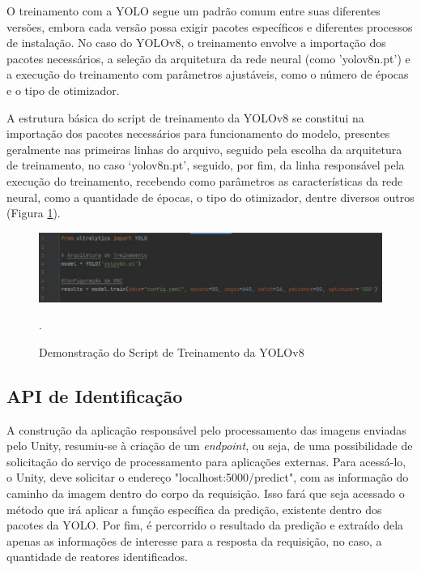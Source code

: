 O treinamento com a YOLO segue um padrão comum entre suas diferentes versões, embora cada versão possa exigir pacotes específicos e diferentes processos de instalação. No caso do YOLOv8, o treinamento envolve a importação dos pacotes necessários, a seleção da arquitetura da rede neural (como 'yolov8n.pt') e a execução do treinamento com parâmetros ajustáveis, como o número de épocas e o tipo de otimizador.

A estrutura básica do script de treinamento da YOLOv8 se constitui na importação dos pacotes necessários para funcionamento do modelo, presentes geralmente nas primeiras linhas do arquivo, seguido pela escolha da arquitetura de treinamento, no caso ‘yolov8n.pt’, seguido, por fim, da linha responsável pela execução do treinamento, recebendo como parâmetros as características da rede neural, como a quantidade de épocas, o tipo do otimizador, dentre diversos outros (Figura \ref{fig:script-yolov8}).

\begin{figure}[!h]
    \centering
    \begin{minipage}{0.6\linewidth}
    \centering
    \captionsetup{justification=centering,margin=0.5cm,font=small}
    \includegraphics[width=1\linewidth]{img/cap5/treinamentoYOLOv8.jpeg}
    \caption{Demonstração do Script de Treinamento da YOLOv8}.
    \label{fig:script-yolov8}
    \end{minipage}
\end{figure}

\subsection{API de Identificação}

A construção da aplicação responsável pelo processamento das imagens enviadas pelo Unity, resumiu-se à criação de um \textit{endpoint}, ou seja, de uma possibilidade de solicitação do serviço de processamento para aplicações externas. Para acessá-lo, o Unity, deve solicitar o endereço "localhost:5000/predict", com as informação do caminho da imagem dentro do corpo da requisição. Isso fará que seja acessado o método que irá aplicar a função específica da predição, existente dentro dos pacotes da YOLO. Por fim, é percorrido o resultado da predição e extraído dela apenas as informações de interesse para a resposta da requisição, no caso, a quantidade de reatores identificados.    

